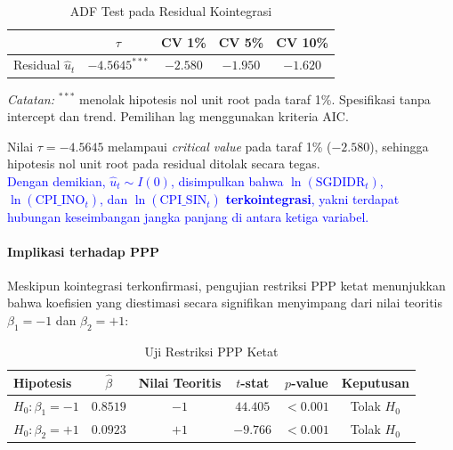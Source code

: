 \documentclass[12pt]{article}
\begin{document}
\begin{table}[H]
    \centering
    \caption{ADF Test pada Residual Kointegrasi}
    \label{tab:eg_step2}
    \begin{tabular}{lcccc}
        \toprule
        & $\tau$ & CV 1\% & CV 5\% & CV 10\% \\
        \midrule
        Residual $\hat{u}_t$ & $-4.5645^{***}$ & $-2.580$ & $-1.950$ & $-1.620$ \\
        \bottomrule
    \end{tabular}
    \begin{tablenotes}
        \small
        \item \textit{Catatan:} $^{***}$ menolak hipotesis nol unit root pada taraf 1\%. 
        Spesifikasi tanpa intercept dan trend. Pemilihan lag menggunakan kriteria AIC.
    \end{tablenotes}
\end{table}

Nilai $\tau = -4.5645$ melampaui \textit{critical value} pada taraf 1\% ($-2.580$), 
sehingga hipotesis nol unit root pada residual ditolak secara tegas.\\
\textcolor{blue}{Dengan demikian, 
$\hat{u}_t \sim I(0)$,  disimpulkan bahwa $\ln(\text{SGDIDR}_t)$, 
$\ln(\text{CPI\_INO}_t)$, dan $\ln(\text{CPI\_SIN}_t)$ \textbf{terkointegrasi}, yakni  
terdapat hubungan keseimbangan jangka panjang di antara ketiga variabel.}

\paragraph{Implikasi terhadap PPP}

Meskipun kointegrasi terkonfirmasi, pengujian restriksi PPP ketat menunjukkan bahwa 
koefisien yang diestimasi secara signifikan menyimpang dari nilai teoritis 
$\beta_1 = -1$ dan $\beta_2 = +1$:

\begin{table}[H]
    \centering
    \caption{Uji Restriksi PPP Ketat}
    \label{tab:ppp_test}
    \begin{tabular}{lccccc}
        \toprule
        Hipotesis & $\hat{\beta}$ & Nilai Teoritis & $t$-stat & $p$-value & Keputusan \\
        \midrule
        $H_0: \beta_1 = -1$ & $0.8519$ & $-1$ & $44.405$ & $<0.001$ & Tolak $H_0$ \\
        $H_0: \beta_2 = +1$ & $0.0923$ & $+1$ & $-9.766$ & $<0.001$ & Tolak $H_0$ \\
        \bottomrule
    \end{tabular}
\end{table}
\end{document}
